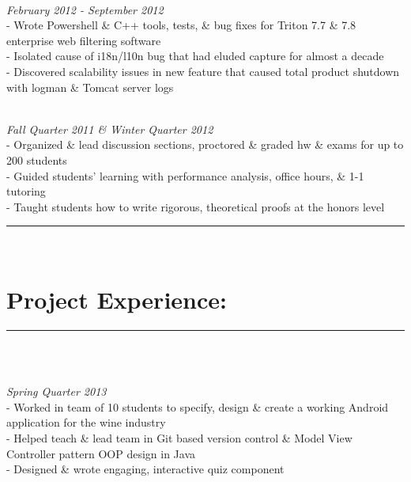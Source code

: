 \documentclass{article}
\newcommand{\sline}{\noindent\rule{575pt}{0.5pt}}
\begin{document}
\begin{spacing}{1.0}
  \\
\hfill {\sl February 2012 - September 2012} \\
\indent \indent - Wrote Powershell \& C++ tools, tests, \& bug fixes for
                  Triton 7.7 \& 7.8 enterprise web filtering software\\
\indent \indent - Isolated cause of i18n/l10n bug that had eluded capture for
                  almost a decade \\
\indent \indent - Discovered scalability issues in new feature that caused total
                  product shutdown with logman \& Tomcat server logs
\end{spacing}

\begin{spacing}{1.0}
 \\
\hfill  {\sl Fall Quarter 2011 \& Winter Quarter 2012} \\
\indent \indent - Organized \& lead discussion sections, proctored \& graded
                  hw \& exams for up to 200 students\\
\indent \indent - Guided students' learning with performance analysis, office
                  hours, \& 1-1 tutoring \\
\indent \indent - Taught students how to write rigorous, theoretical proofs at
                  the honors level
\end{spacing}
\hfill

\sline \\
\section*{Project Experience:}
\sline \\

\begin{spacing}{1.0}
 \\
\hfill {\sl Spring Quarter 2013} \\
\indent \indent - Worked in team of 10 students to specify, design \&
                  create a working Android application for the wine industry \\
\indent \indent - Helped teach \& lead team in Git based version control \&
                  Model View Controller pattern OOP design in Java\\
\indent \indent - Designed \& wrote engaging, interactive quiz component
\end{spacing}
\end{document}
